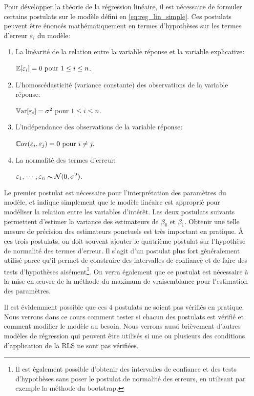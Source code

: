 Pour développer la théorie de la régression linéaire, il est nécessaire de formuler certains postulats sur le modèle défini en \eqref{eq:reg_lin_simple}. Ces postulats peuvent être énoncés mathématiquement en termes d'hypothèses sur les termes d'erreur $\varepsilon_i$ du modèle:
\begin{enumerate}
  \item[$\mathcal{P}_1$.] La linéarité de la relation entre la variable réponse et la variable explicative:
  
  $\mathbb{E}[\varepsilon_i]=0 \mbox{ pour } 1\leq i \leq n$.
 \item[$\mathcal{P}_2$.] L'homoscédasticité (variance constante) des observations de la variable réponse:

 $\mathbb{V}\text{ar}[\varepsilon_i]=\sigma^2 \mbox{ pour } 1\leq i \leq n$.
 \item[$\mathcal{P}_3$.] L'indépendance des observations de la variable réponse:

 $\mathbb{C}\text{ov}(\varepsilon_i,\varepsilon_j)=0 \mbox{ pour } i \neq j.$
 \item[$\mathcal{P}_4$.] La normalité des termes d'erreur:
  
  $\varepsilon_1, \cdots , \varepsilon_n \sim \mathcal{N}(0,\sigma^2)$.
\end{enumerate}
Le premier postulat est nécessaire pour l'interprétation des paramètres du modèle, et indique simplement que le modèle linéaire est approprié pour modéliser la relation entre les variables d'intérêt. Les deux postulats suivants permettent d'estimer la variance des estimateurs de $\beta_0$ et $\beta_1$. Obtenir une telle mesure de précision des estimateurs ponctuels est très important en pratique.
À ces trois postulats, on doit souvent ajouter le quatrième postulat sur l'hypothèse de normalité des termes d'erreur. Il s'agit d'un postulat plus fort généralement utilisé parce qu'il permet de construire des intervalles de confiance et de faire des tests d'hypothèses aisément\footnote{Il est également possible d'obtenir des intervalles de confiance et des tests d'hypothèses sans poser le postulat de normalité des erreurs, en utilisant par exemple la méthode du bootstrap.}. On verra également que ce postulat est nécessaire à la mise en {\oe}uvre de la méthode du maximum de vraisemblance pour l'estimation des paramètres.

Il est évidemment possible que ces 4 postulats ne soient pas vérifiés en pratique. Nous verrons dans ce cours comment tester si chacun des postulats est vérifié et comment modifier le modèle au besoin. Nous verrons aussi brièvement d'autres modèles de régression qui peuvent être utilisés si une ou plusieurs des conditions d'application de la RLS ne sont pas vérifiées.


